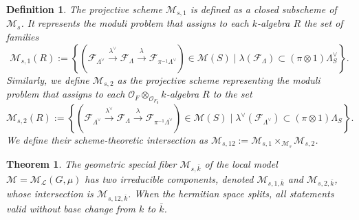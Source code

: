 \documentclass[pdflatex,sn-mathphys-num]{sn-jnl}%
\theoremstyle{thmstyleone}%
\newtheorem{theorem}[subsubsection]{Theorem}%
\theoremstyle{thmstyletwo}%
\numberwithin{equation}{subsection}
\theoremstyle{thmstylethree}%
\newtheorem{definition}[subsubsection]{Definition}%
\newcommand{\CF}{\ensuremath{\mathcal{F}}\xspace}
\newcommand{\CL}{\ensuremath{\mathcal{L}}\xspace}
\newcommand{\CM}{\ensuremath{\mathcal{M}}\xspace}
\newcommand{\CO}{\ensuremath{\mathcal{O}}\xspace}
\begin{document}
\begin{definition}\label{application_moduli:definition}
The projective scheme $\CM_{s,1}$ is defined as a closed subscheme of $\CM_s$. It represents the moduli problem that assigns to each $k$-algebra $R$ the set of families
\begin{equation*}
    \CM_{s,1}(R):=\left\{(\CF_{\Lambda^\vee}\xrightarrow{\lambda^\vee}\CF_\Lambda\xrightarrow{\lambda}\CF_{\pi^{-1}\Lambda^\vee})\in\CM(S)\mid \lambda(\CF_\Lambda)\subset (\pi\otimes 1)\Lambda^\vee_S\right\}.
\end{equation*}
Similarly, we define $\CM_{s,2}$ as the projective scheme representing the moduli problem that assigns to each $\CO_F\otimes_{\CO_{F_0}} k$-algebra $R$ to the set
\begin{equation*}
    \CM_{s,2}(R):=\left\{(\CF_{\Lambda^\vee}\xrightarrow{\lambda^\vee}\CF_\Lambda\xrightarrow{\lambda}\CF_{\pi^{-1}\Lambda^\vee})\in\CM(S)\mid \lambda^\vee(\CF_{\Lambda^\vee})\subset (\pi\otimes 1)\Lambda_S\right\}.
\end{equation*}
We define their scheme-theoretic intersection as $\CM_{s,12}:=\CM_{s,1}\times_{\CM_s}\CM_{s,2}$.
\end{definition}
\begin{theorem}\label{application_moduli-irr:main}
The geometric special fiber $\CM_{s,\bar{k}}$ of the local model $\CM=\CM_\CL(G,\mu)$ has two irreducible components, denoted $\CM_{s,1,\bar{k}}$ and $\CM_{s,2,\bar{k}}$, whose intersection is $\CM_{s,12,\bar{k}}$. When the hermitian space splits, all statements valid without base change from $k$ to $\bar{k}$.
\end{theorem}
\end{document}

